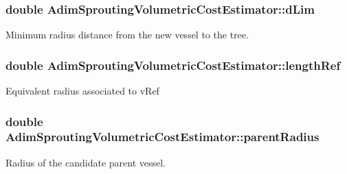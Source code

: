 \subsubsection[{\texorpdfstring{d\+Lim}{dLim}}]{\setlength{\rightskip}{0pt plus 5cm}double Adim\+Sprouting\+Volumetric\+Cost\+Estimator\+::d\+Lim\hspace{0.3cm}{\ttfamily [private]}}\hypertarget{class_adim_sprouting_volumetric_cost_estimator_a1b79ece84388a541810e55879ee99d8a}{}\label{class_adim_sprouting_volumetric_cost_estimator_a1b79ece84388a541810e55879ee99d8a}
Minimum radius distance from the new vessel to the tree. 
\subsubsection[{\texorpdfstring{length\+Ref}{lengthRef}}]{\setlength{\rightskip}{0pt plus 5cm}double Adim\+Sprouting\+Volumetric\+Cost\+Estimator\+::length\+Ref\hspace{0.3cm}{\ttfamily [private]}}\hypertarget{class_adim_sprouting_volumetric_cost_estimator_a10b777646a17f717f48d81287f01863d}{}\label{class_adim_sprouting_volumetric_cost_estimator_a10b777646a17f717f48d81287f01863d}
Equivalent radius associated to {\ttfamily v\+Ref} 
\subsubsection[{\texorpdfstring{parent\+Radius}{parentRadius}}]{\setlength{\rightskip}{0pt plus 5cm}double Adim\+Sprouting\+Volumetric\+Cost\+Estimator\+::parent\+Radius\hspace{0.3cm}{\ttfamily [private]}}\hypertarget{class_adim_sprouting_volumetric_cost_estimator_aecf10c7e6f390a23a1c6efdde6860a09}{}\label{class_adim_sprouting_volumetric_cost_estimator_aecf10c7e6f390a23a1c6efdde6860a09}
Radius of the candidate parent vessel. 
